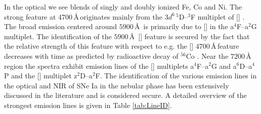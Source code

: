 \documentclass[fleqn,usenatbib]{mnras}
\begin{document}
In the optical we see blends of singly and doubly ionized Fe, Co and Ni. The strong feature at 4700\,\AA\,originates mainly from the $3d^6$\,$^5$D--$^3$F multiplet of [] \citep{1980PhDT.........1A, 1994ApJ...426L..89K}. The broad emission centered around $5900$\,\AA\, is primarily due to [] in the a$^4$F--a$^2$G multiplet. The identification of the $5900$\,\AA\, [] feature is secured by the fact that the relative strength of this feature with respect to e.g. the [] $4700$\,\AA\,feature decreases with time as predicted by radioactive decay of $^{56}$Co \citep{1994ApJ...426L..89K, 2015MNRAS.454.3816C}. Near the $7200$\,\AA\,region the spectra exhibit emission lines of the [] multiplets a$^4$F--a$^2$G and a$^6$D--a$^4$P and the [] multiplet z$^2$D--a$^2$F. The identification of the various emission lines in the optical and NIR of SNe Ia in the nebular phase has been extensively discussed in the literature and is considered secure. A detailed overview of the strongest emission lines is given in Table \ref{tab:LineID}.
\end{document}
